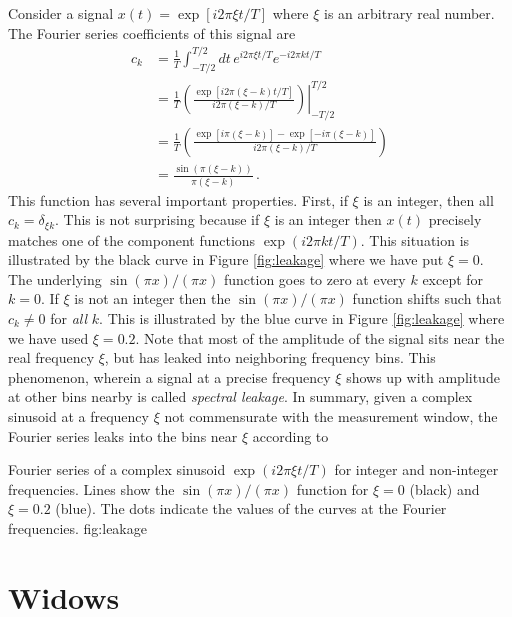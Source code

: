 \documentclass[twocolumn]{article}
\begin{document}
Consider a signal $x(t) = \exp[i 2 \pi \xi t / T]$ where $\xi$ is an arbitrary real number.
The Fourier series coefficients of this signal are
\begin{align}
c_k
&= \frac{1}{T} \int_{-T/2}^{T/2} dt \, e^{i 2 \pi \xi t / T} e^{-i 2 \pi k t / T} \nonumber \\
&= \frac{1}{T} \left. \left( \frac{\exp\left[i 2 \pi (\xi - k) t / T \right]}{i 2 \pi (\xi - k) / T} \right) \right|_{-T/2}^{T/2} \nonumber \\
&= \frac{1}{T} \left( \frac{\exp\left[i \pi (\xi - k) \right] - \exp\left[-i \pi (\xi - k) \right]}{i 2 \pi (\xi - k) / T} \right) \nonumber \\
&= \frac{\sin \left(\pi (\xi - k) \right)}{\pi (\xi - k)} \, .
\end{align}
This function has several important properties.
First, if $\xi$ is an integer, then all $c_k = \delta_{\xi k}$.
This is not surprising because if $\xi$ is an integer then $x(t)$ precisely matches one of the component functions $\exp\left(i 2 \pi k t / T \right)$.
This situation is illustrated by the black curve in Figure \ref{fig:leakage} where we have put $\xi=0$.
The underlying $\sin(\pi x)/(\pi x)$ function goes to zero at every $k$ except for $k=0$.
If $\xi$ is not an integer then the $\sin(\pi x) / (\pi x)$ function shifts such that $c_k \neq 0$ for \emph{all} $k$.
This is illustrated by the blue curve in Figure \ref{fig:leakage} where we have used $\xi = 0.2$.
Note that most of the amplitude of the signal sits near the real frequency $\xi$, but has leaked into neighboring frequency bins.
This phenomenon, wherein a signal at a precise frequency $\xi$ shows up with amplitude at other bins nearby is called \emph{spectral leakage}.
In summary, given a complex sinusoid at a frequency $\xi$ not commensurate with the measurement window, the Fourier series leaks into the bins near $\xi$ according to

{Fourier series of a complex sinusoid $\exp\left(i 2 \pi \xi t / T\right)$ for integer and non-integer frequencies. Lines show the $\sin(\pi x) / (\pi x)$ function for $\xi=0$ (black) and $\xi=0.2$ (blue). The dots indicate the values of the curves at the Fourier frequencies.}
{fig:leakage}


\section{Widows}
\end{document}
